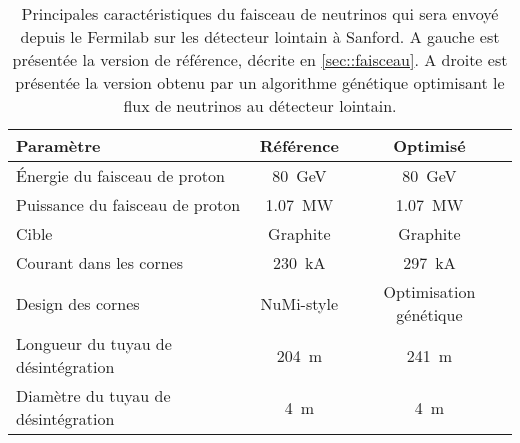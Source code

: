       \begin{table}[htpb]
        \centering
        \begin{tabular}{|lcc|}
          \hline
          \textbf{Paramètre} & \textbf{Référence} & \textbf{Optimisé} \\ \hline\hline
          Énergie du faisceau de proton & \SI{80}{\giga\electronvolt} & \SI{80}{\giga\electronvolt} \\
          Puissance du faisceau de proton & \SI{1.07}{\mega\watt} & \SI{1.07}{\mega\watt} \\
          Cible & Graphite & Graphite  \\
          Courant dans les cornes & \SI{230}{\kilo\ampere} & \SI{297}{\kilo\ampere} \\
          Design des cornes & NuMi-style & Optimisation génétique \\
          Longueur du tuyau de désintégration & \SI{204}{\meter} & \SI{241}{\meter} \\
          Diamètre du tuyau de désintégration & \SI{4}{\meter} & \SI{4}{\meter} \\ \hline
        \end{tabular}
        \caption[Caractéristiques du faisceau de neutrinos de DU$\nu$E]{\label{tab::carac_beam}Principales caractéristiques du faisceau de neutrinos qui sera envoyé depuis le Fermilab sur les détecteur lointain à Sanford. A gauche est présentée la version de référence, décrite en \autoref{sec::faisceau}. A droite est présentée la version obtenu par un algorithme génétique optimisant le flux de neutrinos au détecteur lointain.}
      \end{table}

